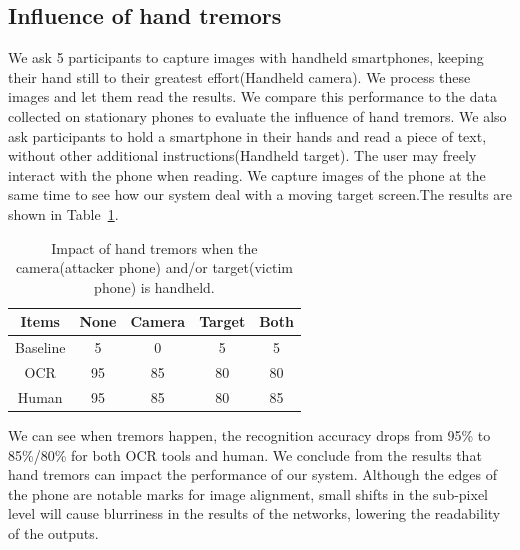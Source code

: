 \subsection{Influence of hand tremors}
We ask 5 participants to capture images with handheld smartphones, keeping their hand still to their greatest effort(Handheld camera). We process these images and let them read the results. We compare this performance to the data collected on stationary phones to evaluate the influence of hand tremors.
We also ask participants to hold a smartphone in their hands and read a piece of text, without other additional instructions(Handheld target). The user may freely interact with the phone when reading. We capture images of the phone at the same time to see how our system deal with a moving target screen.The results are shown in Table~\ref{table-tremor}.

\begin{table}[!t] 
    \centering
    \caption{Impact of hand tremors when the camera(attacker phone) and/or target(victim phone) is handheld.}
    \begin{tabular}{ccccc}
        \toprule
    Items & None & Camera & Target & Both  \\
    \midrule
    Baseline & 5 & 0 & 5& 5\\ 
    \midrule
    OCR & 95 & 85 & 80 & 80\\ 
    Human & 95 & 85 & 80 & 85\\ \bottomrule
    \end{tabular}
    \label{table-tremor}
\end{table}

We can see when tremors happen, the recognition accuracy drops from 95\% to 85\%/80\% for both OCR tools and human. We conclude from the results that hand tremors can impact the performance of our system. Although the edges of the phone are notable marks for image alignment, small shifts in the sub-pixel level will cause blurriness in the results of the networks, lowering the readability of the outputs. 


